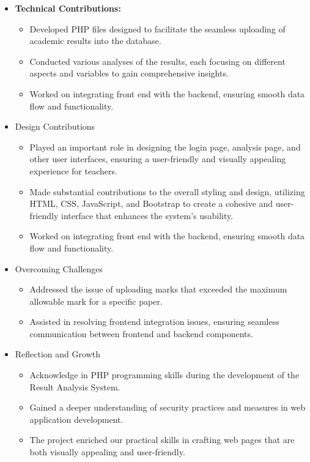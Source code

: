 \documentclass{nascproject}
\begin{document}
	\begin{itemize}
		\item \textbf{Technical Contributions:}
		
		\begin{itemize}
			\item Developed PHP files designed to facilitate the seamless uploading of academic results into the database.
			\item Conducted various analyses of the results, each focusing on different aspects and variables to gain comprehensive insights.
			\item Worked on integrating front end with the backend, ensuring smooth
			data flow and functionality.
		\end{itemize}
		\item Design Contributions
			\begin{itemize}
				\item Played an important role in designing the login page, analysis page, and other user interfaces, ensuring a user-friendly and visually appealing experience for teachers.
				\item Made substantial contributions to the overall styling and design, utilizing HTML, CSS, JavaScript, and Bootstrap to create a cohesive and user-friendly interface that enhances the system's usability.
				\item Worked on integrating front end with the backend, ensuring smooth
				data flow and functionality.
			\end{itemize}
		\item Overcoming Challenges
			\begin{itemize}
				\item Addressed the issue of uploading marks that exceeded the maximum allowable mark for a specific paper.
				\item Assisted in resolving frontend integration issues, ensuring seamless communication between frontend and backend components.
			\end{itemize}
		\item Reflection and Growth
		\begin{itemize}
			\item Acknowledge in PHP programming skills during the development of the Result Analysis System.
			\item Gained a deeper understanding of security practices and measures in
			web application development.
			\item The project enriched our practical skills in crafting web pages that are both visually appealing and user-friendly.
		\end{itemize}
	\end{itemize}
\end{document}
